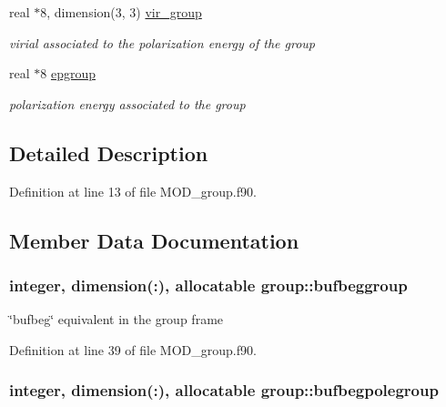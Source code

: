\begin{DoxyCompactItemize}
real $\ast$8, dimension(3, 3) \hyperlink{classgroup_ae2b1827e7bd4a7eb5e50155e2fd036a6}{vir\-\_\-group}
\begin{DoxyCompactList}\small\item\em virial associated to the polarization energy of the group \end{DoxyCompactList}\item 
real $\ast$8 \hyperlink{classgroup_a80e207afd9b26323fa408c4f4c233767}{epgroup}
\begin{DoxyCompactList}\small\item\em polarization energy associated to the group \end{DoxyCompactList}\end{DoxyCompactItemize}


\subsection{Detailed Description}


Definition at line 13 of file M\-O\-D\-\_\-group.\-f90.



\subsection{Member Data Documentation}
\hypertarget{classgroup_a2f0f2630e993dcd27f4c35fdd35f6450}{
\subsubsection[{bufbeggroup}]{\setlength{\rightskip}{0pt plus 5cm}integer, dimension(\-:), allocatable group\-::bufbeggroup}}\label{classgroup_a2f0f2630e993dcd27f4c35fdd35f6450}


\char`\"{}bufbeg\char`\"{} equivalent in the group frame 



Definition at line 39 of file M\-O\-D\-\_\-group.\-f90.

\hypertarget{classgroup_a905b6f20bc398a08c920b2370f07b2db}{
\subsubsection[{bufbegpolegroup}]{\setlength{\rightskip}{0pt plus 5cm}integer, dimension(\-:), allocatable group\-::bufbegpolegroup}}\label{classgroup_a905b6f20bc398a08c920b2370f07b2db}


